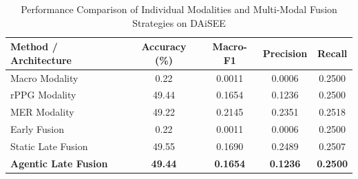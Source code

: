 \begin{table}[htbp]
\centering
\caption{Performance Comparison of Individual Modalities and Multi-Modal Fusion Strategies on DAiSEE}
\label{tab:engagement_results}
\begin{tabular}{lcccc}
\hline
\textbf{Method / Architecture} & \textbf{Accuracy (\%)} & \textbf{Macro-F1} & \textbf{Precision} & \textbf{Recall} \\
\hline
Macro Modality & 0.22 & 0.0011 & 0.0006 & 0.2500 \\
rPPG Modality & 49.44 & 0.1654 & 0.1236 & 0.2500 \\
MER Modality & 49.22 & 0.2145 & 0.2351 & 0.2518 \\
Early Fusion & 0.22 & 0.0011 & 0.0006 & 0.2500 \\
Static Late Fusion & 49.55 & 0.1690 & 0.2489 & 0.2507 \\
\textbf{Agentic Late Fusion} & \textbf{49.44} & \textbf{0.1654} & \textbf{0.1236} & \textbf{0.2500} \\
\hline
\end{tabular}
\end{table}
